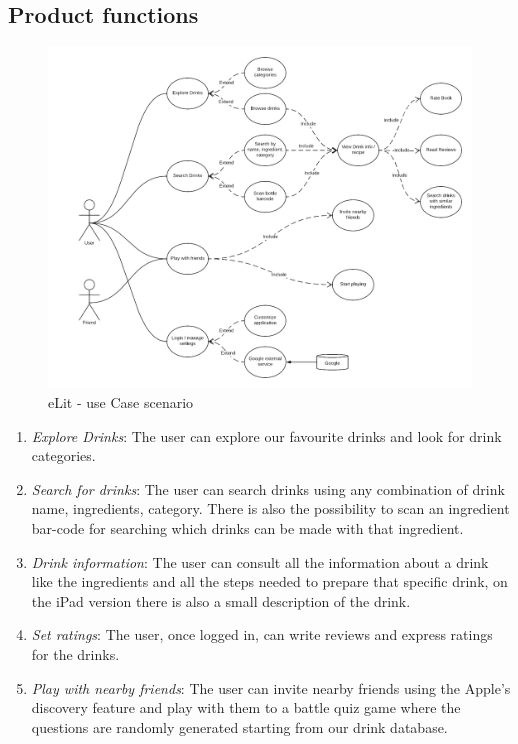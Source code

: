 \documentclass[paper=a4, fontsize=12pt]{scrartcl}
\numberwithin{equation}{section}		%
\numberwithin{figure}{section}			%
\numberwithin{table}{section}				%
\begin{document}
\subsection{Product functions}\label{section:use case}
\begin{figure}[H]
\begin{center}
    \includegraphics[width=\linewidth]{UseCase.png}
    \caption{eLit - use Case scenario}
    \label{UseCase}
\end{center}
\end{figure}

\begin{enumerate}
    \item \textit{Explore Drinks}: The user can explore our favourite drinks and look for drink categories.
    \item \textit{Search for drinks}: The user can search drinks using any combination of drink name, ingredients, category. There is also the possibility to scan an ingredient bar-code for searching which drinks can be made with that ingredient.
    \item \textit{Drink information}: The user can consult all the information about a drink like the ingredients and all the steps needed to prepare that specific drink, on the iPad version there is also a small description of the drink.
    \item \textit{Set ratings}: The user, once logged in, can write reviews and express ratings for the drinks.
    \item \textit{Play with nearby friends}: The user can invite nearby friends using the Apple’s discovery feature and play with them to a battle quiz game where the questions are randomly generated starting from our drink database.

\end{enumerate}
\end{document}
